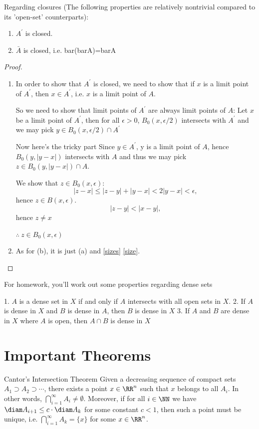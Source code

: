 \begin{prbm}
Regarding closures (The following properties are relatively nontrivial compared to its 'open-set' counterparts):
\begin{enumerate}[label=(\alph*)]
\item $A^\prime$ is closed.
\item $\bar{A}$ is closed, i.e. bar(barA)=barA
\end{enumerate}
\end{prbm}

\begin{proof} \
\begin{enumerate}[label=(\alph*)]
\item In order to show that $A^\prime$ is closed, we need to show that if $x$ is a limit point of $A^\prime$, then $x\in A^\prime$, i.e. $x$ is a limit point of $A$.

So we need to show that limit points of $A^\prime$ are always limit points of $A$: 
Let $x$ be a limit point of $A^\prime$, then for all $\epsilon>0$, $B_0(x,\epsilon/2)$ intersects with $A^\prime$ and we may pick $y \in B_0(x,\epsilon/2)\cap A^\prime$

Now here's the tricky part
Since $y \in A^\prime$, y is a limit point of $A$, hence $B_0(y,|y-x|)$ intersects with $A$ and thus we may pick $z \in B_0(y,|y-x|)\cap A$.

We show that $z \in B_0(x,\epsilon)$:
\[ |z-x|\le|z-y|+|y-x|<2|y-x|<\epsilon, \]
hence $z \in B(x,\epsilon)$.
\[ |z-y|<|x-y|, \]
hence $z \neq x$

$\therefore\:z \in B_0(x,\epsilon)$

\item As for (b), it is just (a) and \cref{sizes} \cref{size}.
\end{enumerate}
\end{proof}

For homework, you'll work out some properties regarding dense sets

1. $A$ is a dense set in $X$ if and only if $A$ intersects with all open sets in $X$.
2. If $A$ is dense in $X$ and $B$ is dense in $A$, then $B$ is dense in $X$
3. If $A$ and $B$ are dense in $X$ where $A$ is open, then $A\cap B$ is dense in $X$

\section{Important Theorems}
\begin{thrm}{Cantor's Intersection Theorem}{}
Given a decreasing sequence of compact sets $A_1\supset A_2 \supset \cdots$, there exists a point $x\in\RR^n$ such that $x$ belongs to all $A_i$. In other words, $\bigcap_{i=1}^\infty A_i\neq\emptyset$. Moreover, if for all $i\in\NN$ we have $\diam A_{i+1}\le c\cdot\diam A_k$ for some constant $c<1$, then such a point must be unique, i.e. $\bigcap_{i=1}^\infty A_k=\{x\}$ for some $x\in\RR^n$.
\end{thrm}

